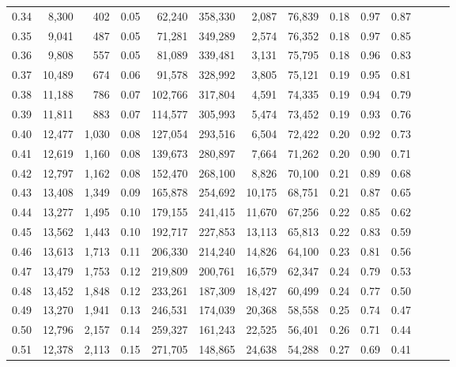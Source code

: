 \begin{tabular}{rrrrrrrrrrrrrr}
0.34 &   8,300 &    402 &  0.05 &   62,240 &  358,330 &   2,087 &  76,839 &  0.18 &  0.97 &      0.87 \\
0.35 &   9,041 &    487 &  0.05 &   71,281 &  349,289 &   2,574 &  76,352 &  0.18 &  0.97 &      0.85 \\
0.36 &   9,808 &    557 &  0.05 &   81,089 &  339,481 &   3,131 &  75,795 &  0.18 &  0.96 &      0.83 \\
0.37 &  10,489 &    674 &  0.06 &   91,578 &  328,992 &   3,805 &  75,121 &  0.19 &  0.95 &      0.81 \\
0.38 &  11,188 &    786 &  0.07 &  102,766 &  317,804 &   4,591 &  74,335 &  0.19 &  0.94 &      0.79 \\
0.39 &  11,811 &    883 &  0.07 &  114,577 &  305,993 &   5,474 &  73,452 &  0.19 &  0.93 &      0.76 \\
0.40 &  12,477 &  1,030 &  0.08 &  127,054 &  293,516 &   6,504 &  72,422 &  0.20 &  0.92 &      0.73 \\
0.41 &  12,619 &  1,160 &  0.08 &  139,673 &  280,897 &   7,664 &  71,262 &  0.20 &  0.90 &      0.71 \\
0.42 &  12,797 &  1,162 &  0.08 &  152,470 &  268,100 &   8,826 &  70,100 &  0.21 &  0.89 &      0.68 \\
0.43 &  13,408 &  1,349 &  0.09 &  165,878 &  254,692 &  10,175 &  68,751 &  0.21 &  0.87 &      0.65 \\
0.44 &  13,277 &  1,495 &  0.10 &  179,155 &  241,415 &  11,670 &  67,256 &  0.22 &  0.85 &      0.62 \\
0.45 &  13,562 &  1,443 &  0.10 &  192,717 &  227,853 &  13,113 &  65,813 &  0.22 &  0.83 &      0.59 \\
0.46 &  13,613 &  1,713 &  0.11 &  206,330 &  214,240 &  14,826 &  64,100 &  0.23 &  0.81 &      0.56 \\
0.47 &  13,479 &  1,753 &  0.12 &  219,809 &  200,761 &  16,579 &  62,347 &  0.24 &  0.79 &      0.53 \\
0.48 &  13,452 &  1,848 &  0.12 &  233,261 &  187,309 &  18,427 &  60,499 &  0.24 &  0.77 &      0.50 \\
0.49 &  13,270 &  1,941 &  0.13 &  246,531 &  174,039 &  20,368 &  58,558 &  0.25 &  0.74 &      0.47 \\
0.50 &  12,796 &  2,157 &  0.14 &  259,327 &  161,243 &  22,525 &  56,401 &  0.26 &  0.71 &      0.44 \\
0.51 &  12,378 &  2,113 &  0.15 &  271,705 &  148,865 &  24,638 &  54,288 &  0.27 &  0.69 &      0.41 \\

\end{tabular}
